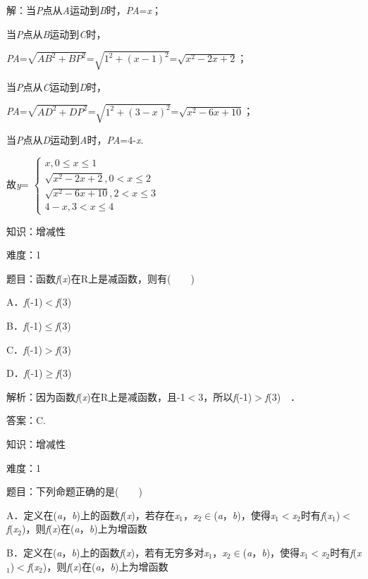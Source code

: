 \documentclass{article} %
\begin{document}
解：当\textit{P}点从\textit{A}运动到\textit{B}时，\textit{PA}=\textit{x}；

当\textit{P}点从\textit{B}运动到\textit{C}时，

\textit{PA}=$\sqrt{AB^{2}+BP^{2}}$=$\sqrt{1^{2}+(x-1)^{2}}$=$\sqrt{x^{2}-2x+2}$；

当\textit{P}点从\textit{C}运动到\textit{D}时，

\textit{PA}=$\sqrt{AD^{2}+DP^{2}}$=$\sqrt{1^{2}+(3-x)^{2}}$=$\sqrt{x^{2}-6x+10}$；

当\textit{P}点从\textit{D}运动到\textit{A}时，\textit{PA}=4-\textit{x}.

故\textit{y}=
$\left\{
\begin{array}{l}
	x, 0 \le x \le 1\\
	\sqrt{x^{2}-2x+2}, 0 < x \le 2\\
	\sqrt{x^{2}-6x+10}, 2 < x \le 3 \\
	4-x, 3 < x \le 4
\end{array}
\right.$


知识：增减性

难度：1

题目：函数\textit{f}(\textit{x})在R上是减函数，则有(　　)

A．\textit{f}(-1)$\mathrm{<}$\textit{f}(3)　　　　　 

B．\textit{f}(-1)$\mathrm{\le}$\textit{f}(3)　

C．\textit{f}(-1)$\mathrm{>}$\textit{f}(3)　   

D．\textit{f}(-1)$\mathrm{\ge}$\textit{f}(3)　

解析：因为函数\textit{f}(\textit{x})在R上是减函数，且-1$\mathrm{<}$3，所以\textit{f}(-1)$\mathrm{>}$\textit{f}(3)　．

答案：C.

知识：增减性

难度：1

题目：下列命题正确的是(　　)

A．定义在(\textit{a}，\textit{b})上的函数\textit{f}(\textit{x})，若存在\textit{x}${}_{1}$，\textit{x}${}_{2}$$\mathrm{\in}$(\textit{a}，\textit{b})，使得\textit{x}${}_{1}$$\mathrm{<}$\textit{x}${}_{2}$时有\textit{f}(\textit{x}${}_{1}$)$\mathrm{<}$\textit{f}(\textit{x}${}_{2}$)，则\textit{f}(\textit{x})在(\textit{a}，\textit{b})上为增函数

B．定义在(\textit{a}，\textit{b})上的函数\textit{f}(\textit{x})，若有无穷多对\textit{x}${}_{1}$，\textit{x}${}_{2}$$\mathrm{\in}$(\textit{a}，\textit{b})，使得\textit{x}${}_{1}$$\mathrm{<}$\textit{x}${}_{2}$时有\textit{f}(\textit{x}${}_{1}$)$\mathrm{<}$\textit{f}(\textit{x}${}_{2}$)，则\textit{f}(\textit{x})在(\textit{a}，\textit{b})上为增函数
\end{document}
